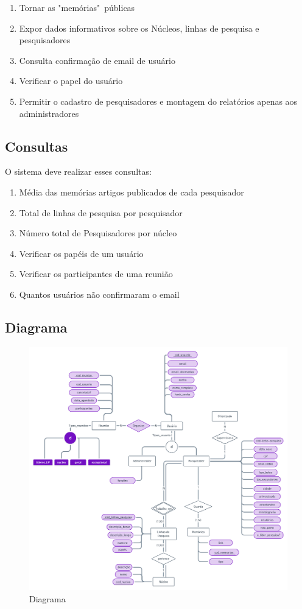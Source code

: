 \documentclass[11pt]{../../classes/ifscarticle}
\begin{document}
\begin{enumerate}
    \item Tornar as "memórias"\ públicas
    \item Expor dados informativos sobre os Núcleos, linhas de pesquisa e pesquisadores
    \item Consulta confirmação de email de usuário
    \item Verificar o papel do usuário
    \item Permitir o cadastro de pesquisadores e montagem do relatórios apenas aos administradores
\end{enumerate}

\subsection{Consultas}


O sistema deve realizar esses consultas:
\begin{enumerate}

    \item Média das memórias artigos publicados de cada pesquisador
    \item Total de linhas de pesquisa por pesquisador
    \item Número total de Pesquisadores por núcleo
    \item Verificar os papéis de um usuário
    \item Verificar os participantes de uma reunião
    \item Quantos usuários não confirmaram o email
\end{enumerate}


\clearpage
\subsection{Diagrama}
\begin{figure}[h]
    \centering
    \includegraphics[width=17cm]{figuras/Diagrama2.png}
    \caption{Diagrama}
    \label{fig:logolatex}
\end{figure}
\clearpage
\end{document}
